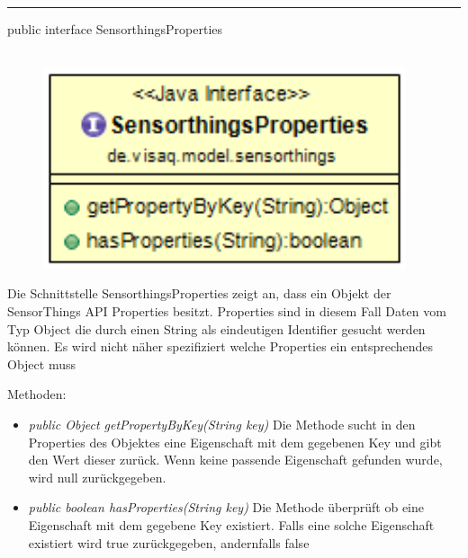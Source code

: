 \rule{\textwidth}{0.4pt}
public interface SensorthingsProperties
\\\\
\begin{minipage}{0.4\textwidth}
    \begin{figure}[H]
        {\centering\includegraphics[width=0.95\textwidth]{media/backend/modell/classes/SensorthingsProperties.png}}
    \end{figure}
    \end{minipage} \hfill
\begin{minipage}{0.6\textwidth}
Die Schnittstelle SensorthingsProperties zeigt an, dass ein Objekt der \gls{SensorThings API} Properties besitzt.
Properties sind in diesem Fall Daten vom Typ Object die durch einen String als eindeutigen Identifier gesucht werden können.
Es wird nicht näher spezifiziert welche Properties ein entsprechendes Object muss
\end{minipage}

Methoden: \begin{itemize}
    \item \emph{public Object getPropertyByKey(String key)} Die Methode sucht in den Properties des Objektes eine Eigenschaft mit dem gegebenen Key und gibt den Wert dieser zurück.
    Wenn keine passende Eigenschaft gefunden wurde, wird null zurückgegeben.
    \item \emph{public boolean hasProperties(String key)} Die Methode überprüft ob eine Eigenschaft mit dem gegebene Key existiert.
    Falls eine solche Eigenschaft existiert wird true zurückgegeben, andernfalls false
\end{itemize}

